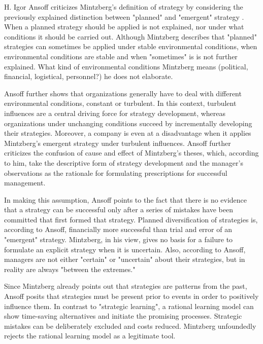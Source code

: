 \documentclass[a4paper,12pt]{article}
\begin{document}
H. Igor Ansoff criticizes Mintzberg's definition of strategy by considering
the previously explained distinction between "planned" and "emergent" strategy
\cite{ansoff}. When a planned strategy should be applied is not explained, nor
under what conditions it should be carried out. Although Mintzberg describes
that "planned" strategies can sometimes be applied under stable environmental
conditions, when environmental conditions are stable and when "sometimes" is
is not further explained. What kind of environmental conditions Mintzberg
means (political, financial, logistical, personnel?) he does not elaborate.

Ansoff further shows that organizations generally have to deal with different
environmental conditions, constant or turbulent. In this context, turbulent
influences are a central driving force for strategy development, whereas
organizations under unchanging conditions succeed by incrementally developing
their strategies.  Moreover, a company is even at a disadvantage when it
applies Mintzberg's emergent strategy under turbulent influences. Ansoff
further criticizes the confusion of cause and effect of Mintzberg's theses,
which, according to him, take the descriptive form of strategy development and
the manager's observations as the rationale for formulating prescriptions for
successful management.

In making this assumption, Ansoff points to the fact that there is no evidence
that a strategy can be successful only after a series of mistakes have been
committed that first formed that strategy. Planned diversification of
strategies is, according to Ansoff, financially more successful than trial and
error of an "emergent" strategy. Mintzberg, in his view, gives no basis for a
failure to formulate an explicit strategy when it is uncertain. Also,
according to Ansoff, managers are not either "certain" or "uncertain" about
their strategies, but in reality are always "between the extremes."

Since Mintzberg already points out that strategies are patterns from the past,
Ansoff posits that strategies must be present prior to events in order to
positively influence them. In contrast to "strategic learning", a rational
learning model can show time-saving alternatives and initiate the promising
processes. Strategic mistakes can be deliberately excluded and costs reduced.
Mintzberg unfoundedly rejects the rational learning model as a legitimate
tool.
\end{document}

